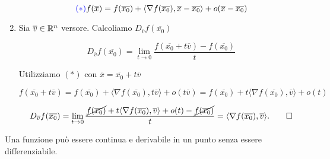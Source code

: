 \begin{dembar}
\begin{enumerate}
		$${\color{blue}(*)} f(\overline{x})=f(\overline{x_0})+\langle \nabla f(\overline{x_0}),\overline{x}-\overline{x_0} \rangle +o(\overline{x}-\overline{x_0})$$
		
		\item Sia $\overline{v}\in \mathbb{R}^n$ versore. Calcoliamo $D_{\overline{v}}f(\overline{x_0})$
		
		$$D_{\overline{v}}f(\overline{x_0})=\lim_{t\rightarrow0}\frac{f(\overline{x_0}+t\overline{v})-f(\overline{x_0})}{t}$$
		
		Utilizziamo {\color{blue}$(*)$} con $\overline{x}=\overline{x_0}+t\overline{v}$
		
		$$f(\overline{x_0}+t\overline{v})=f(\overline{x_0})+\langle \nabla f(\overline{x_0}), t\overline{v} \rangle + o(t\overline{v})=f(\overline{x_0})+t\langle \nabla f(\overline{x_0}),\overline{v} \rangle +o(t)$$
		
		$$D_{\overline{v}}f(\overline{x_0})=\lim_{t\rightarrow 0}\frac{ \cancel{f(\overline{x_0})}+t\langle\nabla f(\overline{x_0}),\overline{v}\rangle+o(t)-\cancel{f(\overline{x_0})}}{t}=\langle \nabla f(\overline{x_0}),\overline{v} \rangle. \qquad \square$$
	\end{enumerate}
\end{dembar}


\begin{attbar}
	Una funzione può essere continua e derivabile in un punto senza essere differenziabile.
\end{attbar}


